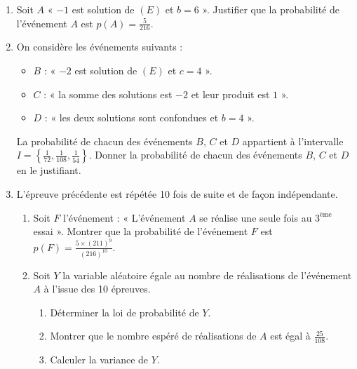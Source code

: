 \documentclass[12pt,a4paper]{article}
\begin{document}
\begin{enumerate}
    \item Soit $A$ « $-1$ est solution de $(E)$ et $b = 6$ ». Justifier que la probabilité de l’événement $A$ est $p(A) = \frac{5}{216}$.
    \item On considère les événements suivants :
    \begin{itemize}
        \item $B$ : « $-2$ est solution de $(E)$ et $c = 4$ ».
        \item $C$ : « la somme des solutions est $-2$ et leur produit est $1$ ».
        \item $D$ : « les deux solutions sont confondues et $b = 4$ ».
    \end{itemize}
    La probabilité de chacun des événements $B$, $C$ et $D$ appartient à l’intervalle $I = \left\{ \frac{1}{72}, \frac{1}{108}, \frac{1}{54} \right\}$. Donner la probabilité de chacun des événements $B$, $C$ et $D$ en le justifiant.
    \item L’épreuve précédente est répétée 10 fois de suite et de façon indépendante. 
    \begin{enumerate}
        \item Soit $F$ l’événement : « L’événement $A$ se réalise une seule fois au $3^{\text{ème}}$ essai ». Montrer que la probabilité de l’événement $F$ est $p(F) = \frac{5 \times (211)^9}{(216)^{10}}$. 
        \item Soit $Y$ la variable aléatoire égale au nombre de réalisations de l’événement $A$ à l’issue des 10 épreuves. 
        \begin{enumerate}
            \item Déterminer la loi de probabilité de $Y$.
            \item Montrer que le nombre espéré de réalisations de $A$ est égal à $\frac{25}{108}$.
            \item Calculer la variance de $Y$.
        \end{enumerate}
    \end{enumerate}
\end{enumerate}
\end{document}
